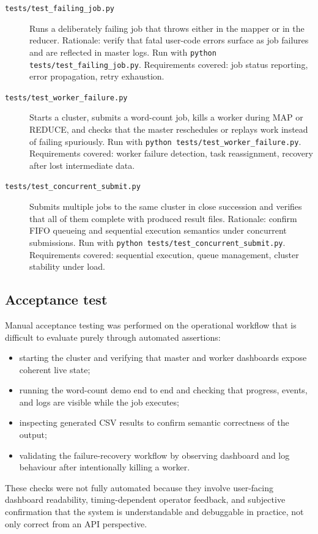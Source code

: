 \documentclass{scrartcl}
\begin{document}
\begin{description}
    \item[\texttt{tests/test\_failing\_job.py}] Runs a deliberately failing job that throws either in the mapper or in the reducer. Rationale: verify that fatal user-code errors surface as job failures and are reflected in master logs. Run with \texttt{python tests/test\_failing\_job.py}. Requirements covered: job status reporting, error propagation, retry exhaustion.
    \item[\texttt{tests/test\_worker\_failure.py}] Starts a cluster, submits a word-count job, kills a worker during MAP or REDUCE, and checks that the master reschedules or replays work instead of failing spuriously. Run with \texttt{python tests/test\_worker\_failure.py}. Requirements covered: worker failure detection, task reassignment, recovery after lost intermediate data.
    \item[\texttt{tests/test\_concurrent\_submit.py}] Submits multiple jobs to the same cluster in close succession and verifies that all of them complete with produced result files. Rationale: confirm FIFO queueing and sequential execution semantics under concurrent submissions. Run with \texttt{python tests/test\_concurrent\_submit.py}. Requirements covered: sequential execution, queue management, cluster stability under load.
\end{description}


\subsection{Acceptance test}\label{acceptance-test}
Manual acceptance testing was performed on the operational workflow that is difficult to evaluate purely through automated assertions:
%
\begin{itemize}
    \item starting the cluster and verifying that master and worker dashboards expose coherent live state;
    \item running the word-count demo end to end and checking that progress, events, and logs are visible while the job executes;
    \item inspecting generated CSV results to confirm semantic correctness of the output;
    \item validating the failure-recovery workflow by observing dashboard and log behaviour after intentionally killing a worker.
\end{itemize}

These checks were not fully automated because they involve user-facing dashboard readability, timing-dependent operator feedback, and subjective confirmation that the system is understandable and debuggable in practice, not only correct from an API perspective.
\end{document}
